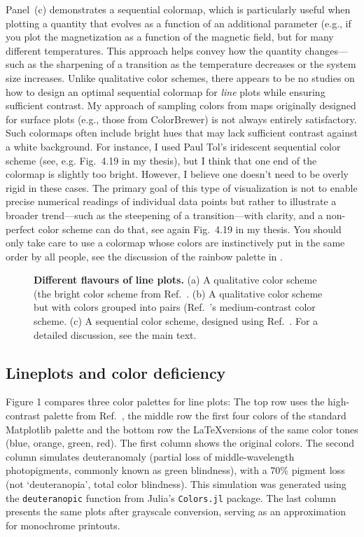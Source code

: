 Panel~(c) demonstrates a sequential colormap, which is particularly useful when plotting a quantity that evolves as a function of an additional parameter (e.g., if you plot the magnetization as a function of the magnetic field, but for many different temperatures. This approach helps convey how the quantity changes---such as the sharpening of a transition as the temperature decreases or the system size increases.
Unlike qualitative color schemes, there appears to be no studies on how to design an optimal sequential colormap for \emph{line} plots while ensuring sufficient contrast. My approach of sampling colors from maps originally designed for surface plots (e.g., those from ColorBrewer) is not always entirely satisfactory. Such colormaps often include bright hues that may lack sufficient contrast against a white background. For instance, I used Paul Tol's iridescent sequential color scheme (see, e.g. Fig.~4.19 in my thesis), but I think that one end of the colormap is slightly too bright. However, I believe one doesn't need to be overly rigid in these cases. The primary goal of this type of visualization is not to enable precise numerical readings of individual data points but rather to illustrate a broader trend---such as the steepening of a transition---with clarity, and a non-perfect color scheme can do that, see again Fig.~4.19 in my thesis. You should only take care to use a colormap whose colors are instinctively put in the same order by all people, see the discussion of the rainbow palette in .

\begin{figure}
	\centering
	
	\caption{\textbf{Different flavours of line plots.} (a) A qualitative color scheme (the bright color scheme from Ref.~\cite{paultol}. (b) A qualitative color scheme but with colors grouped into pairs (Ref.~\cite{paultol}'s medium-contrast color scheme. (c) A sequential color scheme, designed using Ref.~\cite{chromajs}. For a detailed discussion, see the main text.}
	\label{fig:lineplotflavour}
\end{figure}


\subsection{Lineplots and color deficiency}

Figure 1 compares three color palettes for line plots: 
The top row uses the high-contrast palette from Ref.~\cite{paultol}, the middle row the first four colors of the standard Matplotlib palette and the bottom row the \LaTeX versions of the same color tones (blue, orange, green, red). The first column shows the original colors. The second column simulates deuteranomaly (partial loss of middle-wavelength photopigments, commonly known as green blindness), with a 70\% pigment loss (not  `deuteranopia', total color blindness). This simulation was generated using the \verb|deuteranopic| function from Julia’s \verb|Colors.jl| package. The last column presents the same plots after grayscale conversion, serving as an approximation for monochrome printouts.


